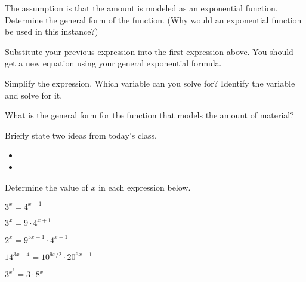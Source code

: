 \begin{problem}
\begin{subproblem}
    \vfill
    
  \item The assumption is that the amount is modeled as an
    exponential function. Determine the general form of the function. (Why
    would an exponential function be used in this instance?)
    
    \vfill
    
  \item Substitute your previous expression into the first expression
    above. You should get a new equation using your general
    exponential formula.

    \vfill
    \vfill
    
  \item Simplify the expression. Which variable can you solve for?
    Identify the variable and solve for it.
    
    \vfill
    
  \item What is the general form for the function that models the
    amount of material?
    \vspace{1em}
  \end{subproblem}

\clearpage



\end{problem}

\postClass

\begin{problem}
\item Briefly state two ideas from today's class.
  \begin{itemize}
  \item
  \item
  \end{itemize}
\item Determine the value of $x$ in each expression below.
  \begin{subproblem}
    \item $3^x = 4^{x+1}$
    \item $3^x = 9\cdot 4^{x+1}$
    \item $2^x = 9^{5x-1}\cdot 4^{x+1}$
    \item $14^{3x+4} = 10^{9x/2}\cdot 20^{6x-1}$
    \item $3^{x^2} = 3 \cdot 8^x$
  \end{subproblem}
\end{problem}


